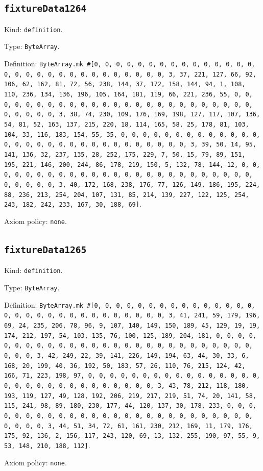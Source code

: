 \documentclass[11pt]{article}
\begin{document}
\subsection*{\texttt{fixtureData1264}}
\noindent Kind: \texttt{definition}.\par
\noindent Type: \texttt{ByteArray}.\par
\noindent Definition: \texttt{ByteArray.mk \#[0, 0, 0, 0, 0, 0, 0, 0, 0, 0, 0, 0, 0, 0, 0, 0, 0, 0, 0, 0, 0, 0, 0, 0, 0, 0, 0, 0, 0, 0, 3, 37, 221, 127, 66, 92, 106, 62, 162, 81, 72, 56, 238, 144, 37, 172, 158, 144, 94, 1, 108, 110, 236, 134, 136, 196, 105, 164, 181, 119, 66, 221, 236, 55, 0, 0, 0, 0, 0, 0, 0, 0, 0, 0, 0, 0, 0, 0, 0, 0, 0, 0, 0, 0, 0, 0, 0, 0, 0, 0, 0, 0, 0, 0, 3, 38, 74, 230, 109, 176, 169, 198, 127, 117, 107, 136, 54, 81, 52, 163, 137, 215, 220, 18, 114, 165, 58, 25, 178, 81, 103, 104, 33, 116, 183, 154, 55, 35, 0, 0, 0, 0, 0, 0, 0, 0, 0, 0, 0, 0, 0, 0, 0, 0, 0, 0, 0, 0, 0, 0, 0, 0, 0, 0, 0, 0, 0, 0, 3, 39, 50, 14, 95, 141, 136, 32, 237, 135, 28, 252, 175, 229, 7, 50, 15, 79, 89, 151, 195, 221, 146, 200, 244, 86, 178, 219, 150, 5, 132, 78, 144, 12, 0, 0, 0, 0, 0, 0, 0, 0, 0, 0, 0, 0, 0, 0, 0, 0, 0, 0, 0, 0, 0, 0, 0, 0, 0, 0, 0, 0, 0, 0, 3, 40, 172, 168, 238, 176, 77, 126, 149, 186, 195, 224, 88, 236, 213, 254, 204, 107, 131, 85, 214, 139, 227, 122, 125, 254, 243, 182, 242, 233, 167, 30, 188, 69]}.\par
\noindent Axiom policy: \texttt{none}.\par
\subsection*{\texttt{fixtureData1265}}
\noindent Kind: \texttt{definition}.\par
\noindent Type: \texttt{ByteArray}.\par
\noindent Definition: \texttt{ByteArray.mk \#[0, 0, 0, 0, 0, 0, 0, 0, 0, 0, 0, 0, 0, 0, 0, 0, 0, 0, 0, 0, 0, 0, 0, 0, 0, 0, 0, 0, 0, 0, 3, 41, 241, 59, 179, 196, 69, 24, 235, 206, 78, 96, 9, 107, 140, 149, 150, 189, 45, 129, 19, 19, 174, 212, 197, 54, 103, 135, 76, 100, 125, 189, 204, 181, 0, 0, 0, 0, 0, 0, 0, 0, 0, 0, 0, 0, 0, 0, 0, 0, 0, 0, 0, 0, 0, 0, 0, 0, 0, 0, 0, 0, 0, 0, 3, 42, 249, 22, 39, 141, 226, 149, 194, 63, 44, 30, 33, 6, 168, 20, 199, 40, 36, 192, 50, 183, 57, 26, 110, 76, 215, 124, 42, 166, 71, 223, 198, 97, 0, 0, 0, 0, 0, 0, 0, 0, 0, 0, 0, 0, 0, 0, 0, 0, 0, 0, 0, 0, 0, 0, 0, 0, 0, 0, 0, 0, 0, 0, 3, 43, 78, 212, 118, 180, 193, 119, 127, 49, 128, 192, 206, 219, 217, 219, 51, 74, 20, 141, 58, 115, 241, 98, 89, 180, 230, 177, 44, 120, 137, 30, 178, 233, 0, 0, 0, 0, 0, 0, 0, 0, 0, 0, 0, 0, 0, 0, 0, 0, 0, 0, 0, 0, 0, 0, 0, 0, 0, 0, 0, 0, 0, 0, 3, 44, 51, 34, 72, 61, 161, 230, 212, 169, 11, 179, 176, 175, 92, 136, 2, 156, 117, 243, 120, 69, 13, 132, 255, 190, 97, 55, 9, 53, 148, 210, 188, 112]}.\par
\noindent Axiom policy: \texttt{none}.\par
\end{document}
